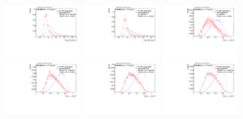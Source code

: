 \begin{figure}
\includegraphics[width=0.3\textwidth]{sascha_input/Appendix/Distributions/w/distributions/beta05/h_normal_tj_D2_05_bin5.pdf} \hspace{1mm}
\includegraphics[width=0.3\textwidth]{sascha_input/Appendix/Distributions/w/distributions/beta05/h_normal_tj_D2_05_bin6.pdf}
\bigskip
\includegraphics[width=0.3\textwidth]{sascha_input/Appendix/Distributions/w/distributions/beta05/h_normal_tj_nSub21_05_bin1.pdf} \hspace{1mm}
\includegraphics[width=0.3\textwidth]{sascha_input/Appendix/Distributions/w/distributions/beta05/h_normal_tj_nSub21_05_bin2.pdf} \hspace{1mm}
\includegraphics[width=0.3\textwidth]{sascha_input/Appendix/Distributions/w/distributions/beta05/h_normal_tj_nSub21_05_bin3.pdf} 
\bigskip
\includegraphics[width=0.3\textwidth]{sascha_input/Appendix/Distributions/w/distributions/beta05/h_normal_tj_nSub21_05_bin4.pdf} \hspace{6mm}

\end{figure}
